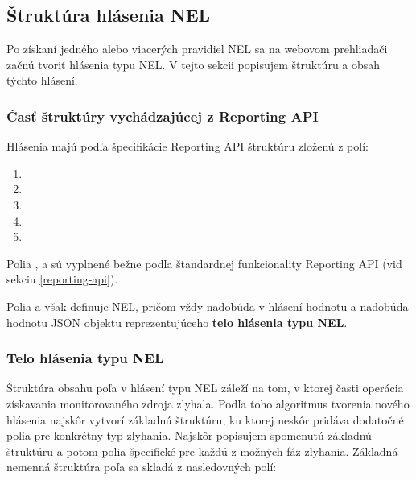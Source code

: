 \pagebreak


\subsection{Štruktúra hlásenia NEL}
\label{struktura-hlasenia-nel}


Po získaní jedného alebo viacerých pravidiel NEL sa na webovom prehliadači začnú tvoriť hlásenia typu NEL.
V tejto sekcii popisujem štruktúru a obsah týchto hlásení.

\subsubsection{Časť štruktúry vychádzajúcej z Reporting API}

Hlásenia majú podľa špecifikácie Reporting API štruktúru zloženú z polí:
\begin{enumerate}
    \item {}
    \item {}
    \item {} 
    \item {}
    \item {}
\end{enumerate}

Polia ,  a  sú vyplnené bežne podľa štandardnej funkcionality Reporting API (viď sekciu \ref{reporting-api}).

Polia  a  však definuje NEL, pričom  vždy nadobúda v hlásení hodnotu  a  nadobúda hodnotu JSON objektu reprezentujúceho \textbf{telo hlásenia typu NEL}.

\subsubsection{Telo hlásenia typu NEL}
\label{network-error-logging-spec-type}

Štruktúra obsahu poľa  v hlásení typu NEL záleží na tom, v ktorej časti operácia získavania monitorovaného zdroja zlyhala.
Podľa toho algoritmus tvorenia nového hlásenia najskôr vytvorí základnú štruktúru, ku ktorej neskôr pridáva dodatočné polia pre konkrétny typ zlyhania.
Najskôr popisujem spomenutú základnú štruktúru a potom polia špecifické pre každú z možných fáz zlyhania.
Základná nemenná štruktúra poľa  sa skladá z nasledovných polí:

